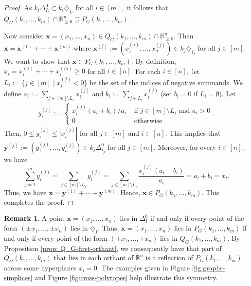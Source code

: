 \documentclass[11pt,a4paper]{article}
\newcommand{\vct}[1]{\boldsymbol{#1}}
\newcommand{\R}{\mathbb{R}}
\newcommand{\1}{\mathbf{1}}
\theoremstyle{plain}
\theoremstyle{definition}
\newtheorem{remark}[theorem]{Remark}
\begin{document}
\begin{proof}
As $k_i\Delta^0_{I_i} \subset k_i\diamondsuit_{I_i}$ for all $i \in [m],$ it follows that $Q_G(k_1,\ldots,k_m)\cap\R_{\ge 0}^n
\supseteq P_G(k_1, \dots, k_m).
$

Now consider $\vct{x} = (x_1, \dots, x_n) \in Q_G(k_1,\ldots,k_m)\cap\R_{\ge 0}^n.$ Then $\vct{x} = \vct{x}^{(1)}+\cdots +\vct{x}^{(m)}$ where $\vct{x}^{(j)}:= (x^{(j)}_1,\dots, x^{(j)}_n) \in k_j\diamondsuit_{I_j}$ for all $j \in [m].$ We want to show that $\vct{x} \in P_G(k_1, \dots, k_m).$ By definition, $x_i = x^{(1)}_i + \cdots + x^{(m)}_i \geq 0$ for all $i \in [n].$ For each $i \in [n],$ let $L_i := \{j \in [m] \mid x^{(j)}_i < 0\}$ be the set of the indices of negative summands. We define $a_i := \sum_{j \in [m]\setminus L_i}x^{(j)}_i$ and $b_i := \sum_{j \in  L_i}x^{(j)}_i$ (set $b_i = 0$ if $L_i = \emptyset$). Let
\begin{align*}
y^{(j)}_i :=
    \begin{cases}
    x^{(j)}_i(a_i+b_i)/a_i &\text{ if } j \in [m]\setminus L_i \text{ and } a_i > 0\\
        0&\text{ otherwise }
    \end{cases}.
\end{align*}
Then, $0 \leq y^{(j)}_i \leq |x^{(j)}_i|$ for all $j \in [m]$ and $i \in [n]$. This implies that $\vct{y}^{(j)}:= (y^{(j)}_1, \dots, y^{(j)}_n) \in k_j\Delta^0_{I_j}$ for all $j \in [m]$. Moreover, for every $i \in [n]$, we have 
\[\sum^m_{j = 1}y^{(j)}_i = \sum_{j\in [m]\setminus L_i}y^{(j)}_i = \sum_{j\in [m]\setminus L_i}\frac{x^{(j)}_i(a_i+b_i)}{a_i} = a_i + b_i = x_i.\]
Thus, we have $\vct{x} = \vct{y}^{(1)} + \cdots + \vct{y}^{(m)}.$ Hence, $\vct{x} \in P_G(k_1, \dots, k_m).$ This completes the proof.
\end{proof}

\begin{remark}\label{rem: Q_G-P_G}
A point $\vct{x}=(x_1,\ldots,x_n)$ lies in $\Delta^0_I$ if and only if every point of the form $(\pm x_1,\ldots,\pm x_n)$ lies in $\diamondsuit_I$. Thus, $\vct{x}=(x_1,\ldots,x_n)$ lies in $P_G(k_1,\ldots,k_m)$ if and only if every point of the form $(\pm x_1,\ldots,\pm x_n)$ lies in $Q_G(k_1,\ldots,k_m)$. By Proposition \ref{prop: Q_G-first-orthant}, we consequently have that part of $Q_G(k_1,\ldots,k_m)$ that lies in each orthant of $\R^n$ is a reflection of $P_G(k_1,\ldots,k_m)$ across some hyperplanes $x_i=0$. The examples given in Figure \ref{fig:graphs-simplices} and Figure \ref{fig:cross-polytopes} help illustrate this symmetry. 
\end{remark}
\end{document}
